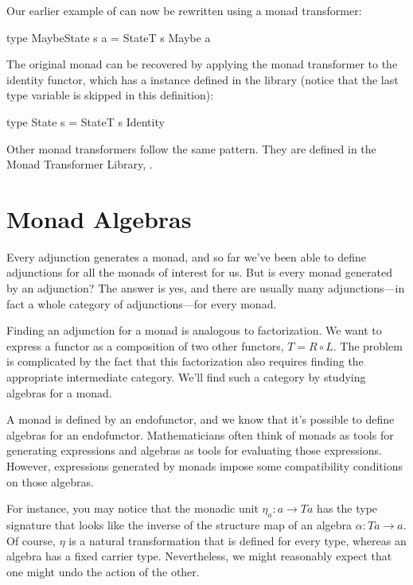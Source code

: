 \documentclass[DaoFP]{subfiles}
\begin{document}
Our earlier example of  can now be rewritten using a monad transformer:
\begin{haskell}
type MaybeState s a = StateT s Maybe a
\end{haskell}

The original  monad can be recovered by applying the  monad transformer to the identity functor, which has a  instance defined in the library (notice that the last type variable  is skipped in this definition):
\begin{haskell}
type State s = StateT s Identity
\end{haskell}

Other monad transformers follow the same pattern. They are defined in the Monad Transformer Library, .

\section{Monad Algebras}

Every adjunction generates a monad, and so far we've been able to define adjunctions for all the monads of interest for us. But is every monad generated by an adjunction? The answer is yes, and there are usually many adjunctions---in fact a whole category of adjunctions---for every monad.

Finding an adjunction for a monad is analogous to factorization. We want to express a functor as a composition of two other functors, $T = R \circ L$. The problem is complicated by the fact that this factorization also requires finding the appropriate intermediate category. We'll find such a category by studying algebras for a monad.

A monad is defined by an endofunctor, and we know that it's possible to define algebras for an endofunctor. Mathematicians often think of monads as tools for generating expressions and algebras as tools for evaluating those expressions. However, expressions generated by monads impose some compatibility conditions on those algebras. 

For instance, you may notice that the monadic unit $\eta_a \colon a \to T a$ has the type signature that looks like the inverse of the structure map of an algebra $\alpha \colon T a \to a$. Of course, $\eta$ is a natural transformation that is defined for every type, whereas an algebra has a fixed carrier type. Nevertheless, we might reasonably expect that one might undo the action of the other.
\end{document}
